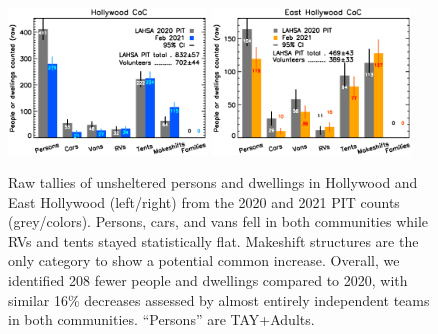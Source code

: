 \documentclass[11pt]{article}
\begin{document}
\begin{figure}[h]
	\centering
	\includegraphics[width = 0.47\textwidth, trim = 1cm 0cm 0cm 0cm]{Hwood2021Bars}
	\includegraphics[width = 0.47\textwidth, trim = 0cm 0cm 1cm 0cm]{Eho2021Bars}
	\caption{Raw tallies of unsheltered persons and dwellings in Hollywood and East Hollywood
			(left/right) from the 2020 and 2021 PIT counts (grey/colors). Persons, cars, 
			and vans fell in both communities while RVs and tents stayed statistically flat. 
			Makeshift structures are the only category to show a potential common increase. 
			Overall, we identified 208 fewer people and dwellings compared to 2020,
			with similar 16\% decreases assessed by almost entirely independent teams
			in both communities. ``Persons'' are TAY+Adults.}
	\label{fig:rawCounts}
\end{figure}
\end{document}
